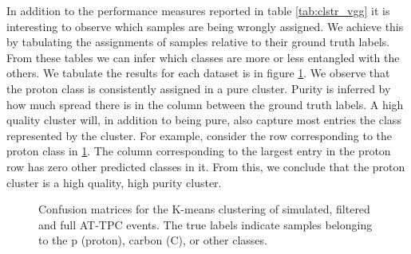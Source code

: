 In addition to the performance measures reported in table \ref{tab:clstr_vgg} it is interesting to observe which samples are being wrongly assigned. We achieve this by tabulating the assignments of samples relative to their ground truth labels. From these tables we can infer which classes are more or less entangled with the others. We tabulate the results for each dataset is in figure \ref{fig:clster_confmat}. We observe that the proton class is consistently assigned in a pure cluster. Purity is inferred by how much spread there is in the column between the ground truth labels. A high quality cluster will, in addition to being pure, also capture most entries the class represented by the cluster. For example, consider the row corresponding to the proton class in \ref{fig:clster_confmat}. The column corresponding to the largest entry in the proton row has zero other predicted classes in it. From this, we conclude that the proton cluster is a high quality, high purity cluster. 

\begin{figure}
\centering

	\hspace{-1cm}
	\hspace{-1cm}
\caption[Pre-trained network - confusion matrices]{Confusion matrices for the K-means clustering of simulated, filtered and full AT-TPC events. The true labels indicate samples belonging to the p (proton), carbon (C), or other classes. }\label{fig:clster_confmat}
\end{figure}

